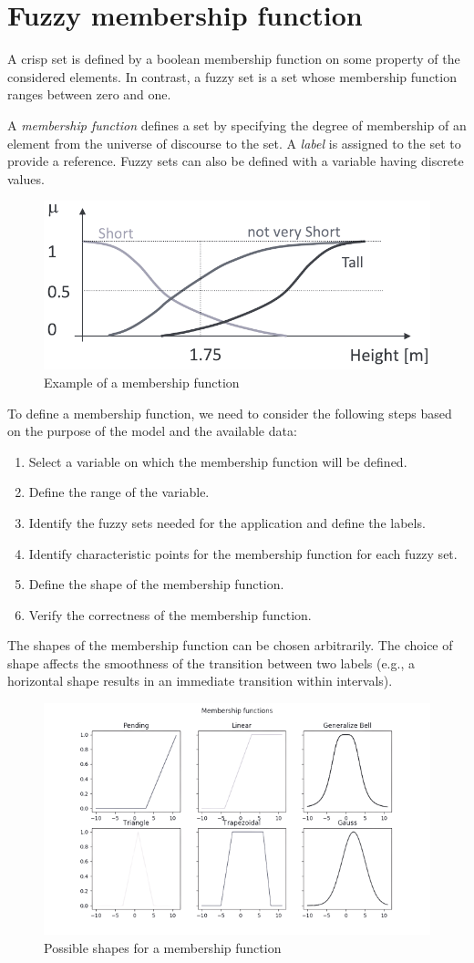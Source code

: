 \documentclass[12pt, a4paper]{report}
\begin{document}
    \section{Fuzzy membership function}
    A crisp set is defined by a boolean membership function on some property of the considered elements. 
    In contrast, a fuzzy set is a set whose membership function ranges between zero and one.
    \begin{definition}
        A \emph{membership function} defines a set by specifying the degree of membership of an element from the universe of discourse to the set. 
        A \emph{label} is assigned to the set to provide a reference. 
        Fuzzy sets can also be defined with a variable having discrete values.
    \end{definition}
    \begin{figure}[H]
        \centering
        \includegraphics[width=0.4\linewidth]{images/function.png}
        \caption{Example of a membership function}
    \end{figure}
    To define a membership function, we need to consider the following steps based on the purpose of the model and the available data:
    \begin{enumerate}
        \item Select a variable on which the membership function will be defined.
        \item Define the range of the variable.
        \item Identify the fuzzy sets needed for the application and define the labels.
        \item Identify characteristic points for the membership function for each fuzzy set.
        \item Define the shape of the membership function.
        \item Verify the correctness of the membership function.
    \end{enumerate}
    The shapes of the membership function can be chosen arbitrarily. 
    The choice of shape affects the smoothness of the transition between two labels (e.g., a horizontal shape results in an immediate transition within intervals).
    \begin{figure}[H]
        \centering
        \includegraphics[width=0.75\linewidth]{images/shape.png}
        \caption{Possible shapes for a membership function}
    \end{figure}
\end{document}

